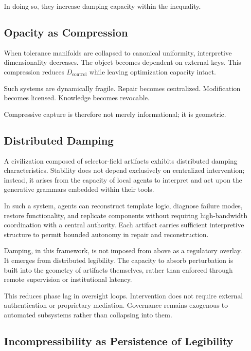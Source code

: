 \documentclass[11pt]{article}
\begin{document}
In doing so, they increase damping capacity within the inequality.

\subsection{Opacity as Compression}

When tolerance manifolds are collapsed to canonical uniformity, 
interpretive dimensionality decreases. The object becomes dependent on 
external keys. This compression reduces $D_{\text{control}}$ while leaving 
optimization capacity intact.

Such systems are dynamically fragile. Repair becomes centralized. 
Modification becomes licensed. Knowledge becomes revocable.

Compressive capture is therefore not merely informational; it is geometric.

\subsection{Distributed Damping}

A civilization composed of selector-field artifacts exhibits distributed
damping characteristics. Stability does not depend exclusively on
centralized intervention; instead, it arises from the capacity of local
agents to interpret and act upon the generative grammars embedded within
their tools.

In such a system, agents can reconstruct template logic, diagnose
failure modes, restore functionality, and replicate components without
requiring high-bandwidth coordination with a central authority. Each
artifact carries sufficient interpretive structure to permit bounded
autonomy in repair and reconstruction.

Damping, in this framework, is not imposed from above as a regulatory
overlay. It emerges from distributed legibility. The capacity to absorb
perturbation is built into the geometry of artifacts themselves, rather
than enforced through remote supervision or institutional latency.

This reduces phase lag in oversight loops. Intervention does not require 
external authentication or proprietary mediation. Governance remains 
exogenous to automated subsystems rather than collapsing into them.

\subsection{Incompressibility as Persistence of Legibility}
\end{document}

